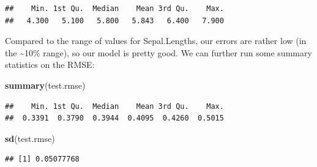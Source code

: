 \documentclass[]{article}
\newenvironment{Shaded}{\begin{snugshade}}{\end{snugshade}}
\newcommand{\KeywordTok}[1]{\textcolor[rgb]{0.13,0.29,0.53}{\textbf{#1}}}
\newcommand{\DataTypeTok}[1]{\textcolor[rgb]{0.13,0.29,0.53}{#1}}
\newcommand{\StringTok}[1]{\textcolor[rgb]{0.31,0.60,0.02}{#1}}
\newcommand{\OperatorTok}[1]{\textcolor[rgb]{0.81,0.36,0.00}{\textbf{#1}}}
\newcommand{\NormalTok}[1]{#1}
\begin{document}
\begin{verbatim}
##    Min. 1st Qu.  Median    Mean 3rd Qu.    Max. 
##   4.300   5.100   5.800   5.843   6.400   7.900
\end{verbatim}

Compared to the range of values for Sepal.Lengths, our errors are rather
low (in the \textasciitilde{}10\% range), so our model is pretty good.
We can further run some summary statistics on the RMSE:

\begin{Shaded}
\begin{Highlighting}[]
\KeywordTok{summary}\NormalTok{(test.rmse)}
\end{Highlighting}
\end{Shaded}

\begin{verbatim}
##    Min. 1st Qu.  Median    Mean 3rd Qu.    Max. 
##  0.3391  0.3790  0.3944  0.4095  0.4260  0.5015
\end{verbatim}

\begin{Shaded}
\begin{Highlighting}[]
\KeywordTok{sd}\NormalTok{(test.rmse)}
\end{Highlighting}
\end{Shaded}

\begin{verbatim}
## [1] 0.05077768
\end{verbatim}

\begin{Shaded}
\end{Shaded}
\end{document}
